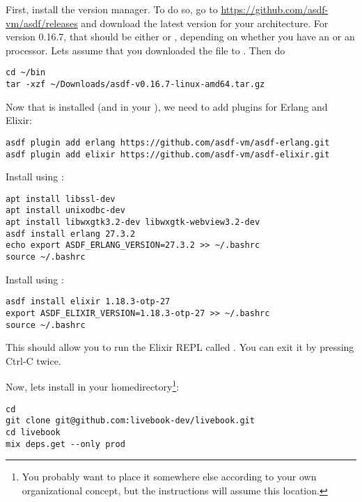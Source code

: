 First, install the  version manager. To do so, go to \url{https://github.com/asdf-vm/asdf/releases} and download the latest version for your architecture. For version 0.16.7, that should be either  or , depending on whether you have an  or an  processor. Lets assume that you downloaded the  file to . Then do

\begin{verbatim}
cd ~/bin
tar -xzf ~/Downloads/asdf-v0.16.7-linux-amd64.tar.gz
\end{verbatim}

Now that  is installed (and in your ), we need to add plugins for Erlang and Elixir:

\begin{verbatim}
asdf plugin add erlang https://github.com/asdf-vm/asdf-erlang.git
asdf plugin add elixir https://github.com/asdf-vm/asdf-elixir.git
\end{verbatim}

Install  using :

\begin{verbatim}
apt install libssl-dev
apt install unixodbc-dev
apt install libwxgtk3.2-dev libwxgtk-webview3.2-dev
asdf install erlang 27.3.2
echo export ASDF_ERLANG_VERSION=27.3.2 >> ~/.bashrc
source ~/.bashrc
\end{verbatim}

Install  using :

\begin{verbatim}
asdf install elixir 1.18.3-otp-27
export ASDF_ELIXIR_VERSION=1.18.3-otp-27 >> ~/.bashrc
source ~/.bashrc
\end{verbatim}

This should allow you to run the Elixir REPL called . You can exit it by pressing Ctrl-C twice.

Now, lets install  in your homedirectory\footnote{You probably want to place it somewhere else according to your own organizational concept, but the instructions will assume this location.}:

\begin{verbatim}
cd
git clone git@github.com:livebook-dev/livebook.git
cd livebook
mix deps.get --only prod
\end{verbatim}

